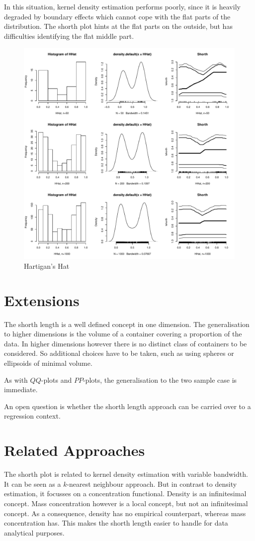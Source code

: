 \documentclass[dvips,12pt,a4paper,twoside]{amsart}
\begin{document}
In this situation, kernel density estimation performs poorly, since it is heavily degraded by boundary effects which cannot cope with the flat parts of the distribution. The shorth plot hints at the flat parts on the outside, but has difficulties identifying the flat middle part.
%
\begin{figure}[htb]
\includegraphics[width=0.9\linewidth]{TheShorthPlot-hhat}
\caption{Hartigan's Hat}\label{fig: hhat}
\end{figure}

%
\clearpage
%
\section{Extensions}
The shorth length is a well defined concept in one dimension. The generalisation to higher dimensions is the volume of a container covering a proportion of the data. In higher dimensions however there is no distinct class of containers to be considered. So additional choices have to be taken, such as using spheres or ellipsoids of minimal volume.

As with $QQ$-plots and $PP$-plots, the generalisation to the two sample case is immediate.

An open question is whether the shorth length approach can be carried over to a regression context.

\section{Related Approaches}
The shorth plot is related to kernel density estimation with variable bandwidth. It can be seen as a $k$-nearest neighbour approach. But in contrast to density estimation, it focusses on a concentration functional. Density is an infinitesimal concept. Mass concentration however is a local concept, but not an infinitesimal concept. As a consequence, density has no empirical counterpart, whereas mass concentration has. This makes the shorth length easier to handle for data analytical purposes.
\end{document}
